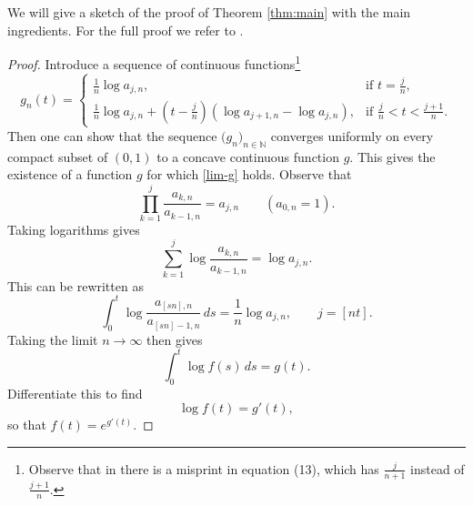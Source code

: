 \documentclass[12pt]{article}
\newcommand{\ds}{\displaystyle}
\numberwithin{equation}{section}
\begin{document}
We will give a sketch of the proof of Theorem \ref{thm:main} with the main ingredients. For the full proof we refer to \cite{WVAFO}.
\begin{proof}
Introduce a sequence of continuous functions\footnote{Observe that in \cite{WVAFO} there is a misprint in equation (13), which has $\frac{j}{n+1}$ instead of $\frac{j+1}{n}$.}
\[  g_n(t) = \begin{cases}     \ds \frac{1}{n} \log a_{j,n}, & \ds \textrm{if } t = \frac{j}{n}, \\[10pt]
               \ds   \frac{1}{n} \log a_{j,n} + \left( t- \frac{j}{n} \right) ( \log a_{j+1,n} -\log a_{j,n}), & \ds \textrm{if } \frac{j}{n} < t < \frac{j+1}{n}.
  \end{cases} \]
Then one can show that  the sequence $\bigl(g_n)_{n \in \mathbb{N}}$ converges uniformly on every compact subset of $(0,1)$ to a concave continuous function $g$.
This gives the existence of a function $g$ for which \eqref{lim-g} holds. 
Observe that
\[   \prod_{k=1}^j \frac{a_{k,n}}{a_{k-1,n}} = a_{j,n} \qquad (a_{0,n} = 1). \]
Taking logarithms gives
\[    \sum_{k=1}^j  \log \frac{a_{k,n}}{a_{k-1,n}} = \log a_{j,n}. \]
This can be rewritten as
\[     \int_0^t \log \frac{a_{[sn],n}}{a_{[sn]-1,n}} \, ds = \frac{1}{n}  \log a_{j,n},   \qquad    j = [nt] .  \]
Taking the limit $n \to \infty$ then gives
\[   \int_0^t  \log f(s)\, ds = g(t).  \]
Differentiate this to find
\[      \log f(t) = g'(t) , \]
so that $f(t) = e^{g'(t)}$.  


\end{proof}
\end{document}
